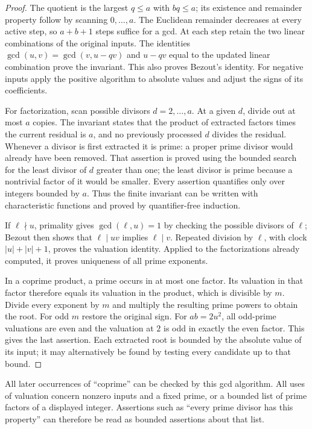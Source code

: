 \begin{proof}
The quotient is the largest $q\leq a$ with $bq\leq a$; its existence and
remainder property follow by scanning $0,\ldots,a$. The Euclidean
remainder decreases at every active step, so $a+b+1$ steps suffice for a
gcd. At each step retain the two linear combinations of the original
inputs. The identities $\gcd(u,v)=\gcd(v,u-qv)$ and
$u-qv$ equal to the updated linear combination prove the invariant.
This also proves Bezout's identity. For negative inputs apply the positive
algorithm to absolute values and adjust the signs of its coefficients.

For factorization, scan possible divisors $d=2,\ldots,a$. At a given
$d$, divide out at most $a$ copies. The invariant states that the product
of extracted factors times the current residual is $a$, and no previously
processed $d$ divides the residual. Whenever a divisor is first extracted
it is prime: a proper prime divisor would already have been removed.
That assertion is proved using the bounded search for the least divisor
of $d$ greater than one; the least divisor is prime because a nontrivial
factor of it would be smaller. Every assertion quantifies only over
integers bounded by $a$. Thus the finite invariant can be written with
characteristic functions and proved by quantifier-free induction.

If $\ell\nmid u$, primality gives $\gcd(\ell,u)=1$ by checking the
possible divisors of $\ell$; Bezout then shows that
$\ell\mid uv$ implies $\ell\mid v$. Repeated division by $\ell$, with
clock $|u|+|v|+1$, proves the valuation identity. Applied to the
factorizations already computed, it proves uniqueness of all prime
exponents.

In a coprime product, a prime occurs in at most one factor. Its valuation
in that factor therefore equals its valuation in the product, which is
divisible by $m$. Divide every exponent by $m$ and multiply the resulting
prime powers to obtain the root. For odd $m$ restore the original sign.
For $ab=2u^2$, all odd-prime valuations are even and the valuation at $2$
is odd in exactly the even factor. This gives the last assertion.
Each extracted root is bounded by the absolute value of its input; it may
alternatively be found by testing every candidate up to that bound.
\end{proof}

All later occurrences of ``coprime'' can be checked by this gcd algorithm.
All uses of valuation concern nonzero inputs and a fixed prime, or a
bounded list of prime factors of a displayed integer. Assertions such as
``every prime divisor has this property'' can therefore be read as bounded
assertions about that list.

